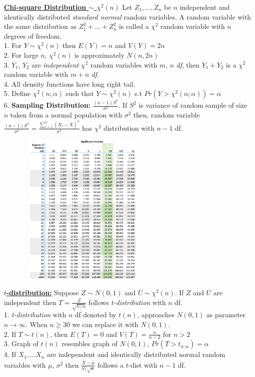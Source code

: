 \documentclass[10pt,landscape]{article}
\begin{document}
\begin{multicols*}{3}
\textbf{\underline{Chi-square Distribution $\sim$ $\chi^2(n)$}} Let $Z_1, \ldots, Z_n$ be $n$ independent and identically distributed \textit{standard normal} random variables. A random variable
with the same distribution as $Z_1^2 + \ldots + Z_n^2$ is called a $\chi^2$ random variable with $n$ degrees of freedom. \\ 
1. For $Y \sim \chi^2(n)$ then $E(Y) = n$ and $V(Y) = 2n$ \\
2. For large $n$, $\chi^2(n)$ is approximately $N(n, 2n)$ \\
3. $Y_1$, $Y_2$ are \textit{independent} $\chi^2$ random variables with $m$, $n$ \textit{df}, then $Y_1 + Y_2$ is a $\chi^2$ random variable with $m+n$ \textit{df}. \\ 
4. All density functions have long right tail.\\
5. Define $\chi^2(n;\alpha)$ such that $Y \sim \chi^2(n)$ s.t $Pr(Y > \chi^2(n;\alpha)) = \alpha$ \\ 
6. \textbf{Sampling Distribution:} $\frac{(n-1)S^2}{\sigma^2}$. If $S^2$ is variance of random sample of size $n$ taken 
from a normal population with $\sigma^2$ then, random variable $\frac{(n-1)S^2}{\sigma^2} = \frac{\sum^n_{i=1}(X_i - \overline{X})^2}{\sigma^2}$ has $\chi^2$ distribution with $n-1$ df.

\includegraphics*[width=8.5cm, height=7.5cm]{chi-square-distribution-table.png}

\textbf{\underline{$t$-distribution:}} Suppose $Z \sim N(0,1)$ and $U \sim \chi^2(n)$. If $Z$ and $U$ are independent then $T = \frac{Z}{\sqrt{U/n}}$ follows \textit{t-distribution} with $n$ df. \\ 
1. \textit{t-distribution} with $n$ df denoted by $t(n)$, approaches $N(0,1)$ as parameter $n\rightarrow\infty$. When $n\geq 30$ we can replace it with $N(0,1)$. \\ 
2. If $T\sim t(n)$, then $E(T) = 0$ and $V(T) = \frac{n}{n-2}$ for $n > 2$ \\ 
3. Graph of $t(n)$ resembles graph of $N(0,1)$,  $Pr(T > t_{n;\alpha}) = \alpha$ \\ 
4. If $X_1, \ldots X_n$ are independent and identically distributed normal random variables with $\mu$, $\sigma^2$ then $\frac{\overline{X}-\mu}{S/\sqrt{n}}$ follows a $t$-dist with $n-1$ df.


\end{multicols*}
\end{document}
